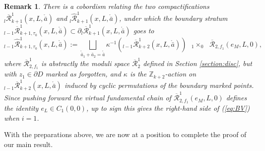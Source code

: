 \documentclass[a4paper]{article}
\newtheorem{remark}[theorem]{Remark}
\numberwithin{equation}{section}
\begin{document}
\begin{remark}
There is a cobordism relating the two compactifications ${}_l\overline{\mathcal{R}}_{k+1}^1(x,L,\ring{\bar{a}})$ and ${}_l\widehat{\mathcal{R}}_{k+1}^1(x,L,\ring{\bar{a}})$, under which the boundary stratum ${}_{l-1}\overline{\mathcal{R}}_{k+1,\tau_0}^1(x,L,\ring{\bar{a}})\subset\partial{}_l\overline{\mathcal{R}}_{k+1}^1(x,L,\ring{\bar{a}})$ goes to
\begin{equation}
{}_{l-1}\widehat{\mathcal{R}}_{k+1,\tau_0}^1(x,L,\ring{\bar{a}}):=\bigsqcup_{\ring{\bar{a}}_1+\bar{a}_2=\ring{\bar{a}}}\kappa^{-1}\left({}_{l-1}\overline{\mathcal{R}}_{k+2}^1(x,L,\ring{\bar{a}})\right)\textrm{ }{{}_1\times_0}\textrm{ }\overline{\mathcal{R}}_{2,f_1}(e_M,L,0),
\end{equation}
where $\overline{\mathcal{R}}_{2,f_1}^1$ is abstractly the moduli space $\overline{\mathcal{R}}_2^1$ defined in Section \ref{section:disc}, but with $z_1\in\partial D$ marked as forgotten, and $\kappa$ is the $\mathbb{Z}_{k+2}$-action on ${}_{l-1}\overline{\mathcal{R}}_{k+2}^1(x,L,\ring{\bar{a}})$ induced by cyclic permutations of the boundary marked points. Since pushing forward the virtual fundamental chain of $\overline{\mathcal{R}}_{2,f_1}^1(e_M,L,0)$ defines the identity $e_L\in C_1(0,0)$, up to sign this gives the right-hand side of (\ref{eq:BV}) when $i=1$.
\end{remark}

With the preparations above, we are now at a position to complete the proof of our main result.
\end{document}
